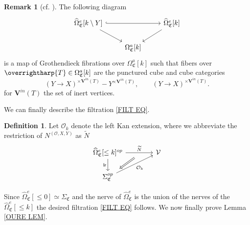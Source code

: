 \documentclass[a4paper,10pt
]{article}%
\numberwithin{equation}{section}
\numberwithin{figure}{section}
\theoremstyle{definition} %
\newtheorem{definition}[equation]{Definition}%
\newtheorem{remark}[equation]{Remark}%
\newcommand{\vect}[1]{\text{\overrightharp{\ensuremath{#1}}}}
\newcommand{\V}{\ensuremath{\mathcal V}}
\renewcommand{\O}{\ensuremath{\mathcal O}}
\newcommand{\1}{\ensuremath{\mathbbm 1}}%
\newcommand{\SC}{\Sigma_{\mathfrak C}}
\begin{document}
\begin{remark}[{cf. \cite[Remark 5.66]{BP21}}]
	\label{OEFIB REM}
	The following diagram
	\begin{equation}
	\begin{tikzcd}
	\widehat\Omega_{\mathfrak C}^e[k \setminus Y] \arrow[rr, hookrightarrow] \arrow[dr]
	&&
	\widehat\Omega_{\mathfrak C}^e[k] \arrow[dl]
	\\
	&
	\Omega_{\mathfrak C}^a[k]
	\end{tikzcd}
	\end{equation}
	is a map of Grothendieck fibrations over $\Omega_{\mathfrak C}^a[k]$
	such that fibers over $\vect{T} \in \Omega_{\mathfrak C}^a[k]$ are the punctured cube and cube categories
	\begin{equation}
	(Y \to X)^{\times \boldsymbol{V}^{in}(T)} - Y^{\times \boldsymbol{V}^{in}(T)},
	\qquad
	(Y \to X)^{\times \boldsymbol{V}^{in}(T)}.
	\end{equation}
	for $\boldsymbol{V}^{in}(T)$ the set of inert vertices.
\end{remark}



We can finally describe the filtration \eqref{FILT EQ}.
\begin{definition}\label{FILTSTAGE DEF}
	Let $\O_k$ denote the left Kan extension, 
	where we abbreviate the restriction of $N^{(\O,X,Y)}$ as $\widetilde{N}$
	\begin{equation}
	\begin{tikzcd}[column sep = 40pt]
	\widehat\Omega_{\mathfrak C}^e[\leq k]^{op}
	\ar{r}{\widetilde N}[swap,name = A]{} \arrow[d, "\mathsf{lr}"']
	&
	\V
	\\
	|[alias = B]|
	\SC^{op}
	\arrow[ur, "\O_k"']
	\arrow[Rightarrow, from = A, to = B, shorten <=0.2cm, shorten >=0.2cm]
	\end{tikzcd}
	\end{equation}
\end{definition}

Since $\widehat\Omega_{\mathfrak C}^e[\leq 0] \simeq \SC$
and the nerve of $\widehat \Omega_{\mathfrak C}^e$ is the union of the nerves of the $\widehat\Omega_{\mathfrak C}^e[\leq k]$
the desired filtration \eqref{FILT EQ} follows.
%
We now finally prove Lemma \ref{OURE LEM}.
\end{document}
